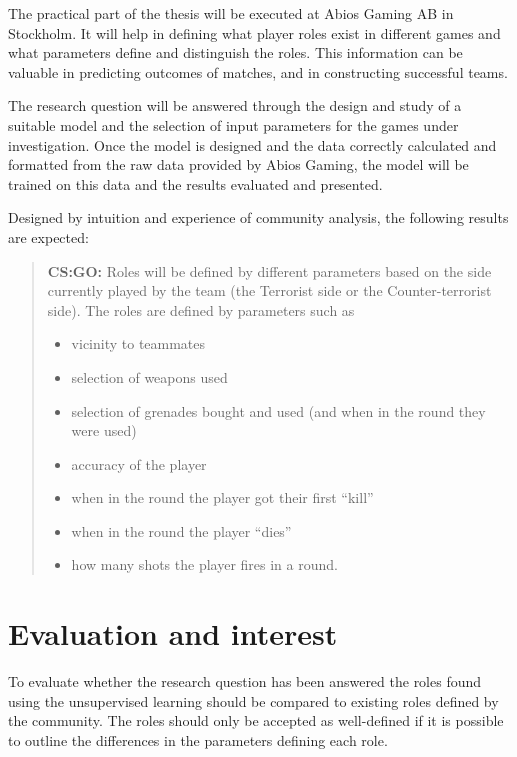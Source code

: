 \documentclass{article}
\begin{document}
The practical part of the thesis will be executed at Abios Gaming AB in Stockholm. It will help in defining what player roles exist in different games and what parameters define and distinguish the roles. This information can be valuable in predicting outcomes of matches, and in constructing successful teams.

The research question will be answered through the design and study of a suitable model and the selection of input parameters for the games under investigation. Once the model is designed and the data correctly calculated and formatted from the raw data provided by Abios Gaming, the model will be trained on this data and the results evaluated and presented.

Designed by intuition and experience of community analysis, the following results are expected:
\begin{quote}
    {\bf CS:GO:} Roles will be defined by different parameters based on the side currently played by the team (the Terrorist side or the Counter-terrorist side). The roles are defined by parameters such as
    \begin{itemize}
        \item vicinity to teammates
        \item selection of weapons used
        \item selection of grenades bought and used (and when in the round they were used)
        \item accuracy of the player
        \item when in the round the player got their first ``kill''
        \item when in the round the player ``dies''
        \item how many shots the player fires in a round.
    \end{itemize}
\end{quote}

\section{Evaluation and interest}
To evaluate whether the research question has been answered the roles found using the unsupervised learning should be compared to existing roles defined by the community. The roles should only be accepted as well-defined if it is possible to outline the differences in the parameters defining each role.
\end{document}

